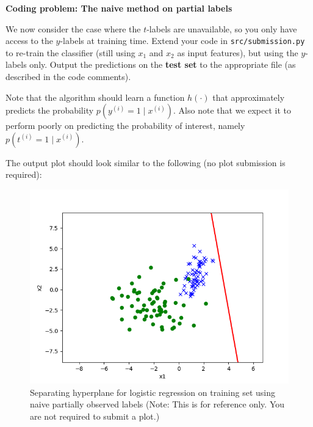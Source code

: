 \item {} \textbf{Coding problem: The naive method on partial labels}

We now consider the case where the $t$-labels are unavailable, so you only have
access to the $y$-labels at training time. Extend your code in
\texttt{src/submission.py} to re-train the classifier (still using $x_1$ and
$x_2$ as input features), but using the $y$-labels only. Output the predictions
on the \textbf{test set} to the appropriate file (as described in the code comments).

Note that the algorithm should learn a function $h(\cdot)$ that approximately predicts the probability $p(y^{(i)}=1\mid x^{(i)})$. Also note that we expect it to perform poorly on predicting the probability of interest, namely $p(t^{(i)}=1\mid x^{(i)})$.

The output plot should look similar to the following (no plot submission is required):
\begin{figure}[H]
	\centering
	\vspace{2mm}
	\includegraphics[width=0.5\linewidth]{02-posonly/posonly_naive_pred.png}
    \caption{Separating hyperplane for logistic regression on training set using naive partially observed labels (Note: This is for reference only.  You are not required to submit a plot.)}
\end{figure}

